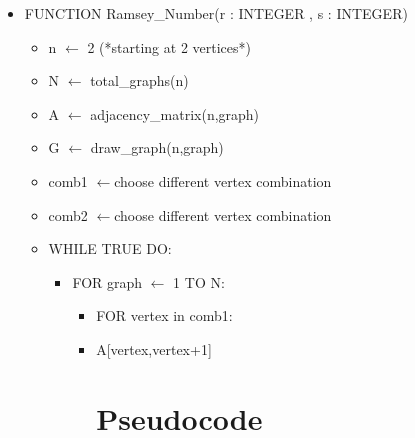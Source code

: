 \documentclass{Assignment}
\begin{document}
\begin{itemize}
\item FUNCTION Ramsey\_Number(r : INTEGER , s : INTEGER)\\
\begin{itemize}
\item  n $\leftarrow$ 2 (*starting at 2 vertices*)
\item N $\leftarrow$ total\_graphs(n)
	\item A $\leftarrow$ adjacency\_matrix(n,graph)
\item G $\leftarrow$ draw\_graph(n,graph)
\item comb1 $\leftarrow$choose different vertex combination
\item comb2 $\leftarrow$choose different vertex combination
\item WHILE TRUE DO:
\begin{itemize}
\item FOR graph $\leftarrow$ 1 TO N:


\begin{itemize}
\item FOR vertex in comb1:
\item A[vertex,vertex+1]
\section*{Pseudocode}
\end{itemize}
\end{itemize}
\end{itemize}
\end{itemize}
\newpage
{}
\end{document}
